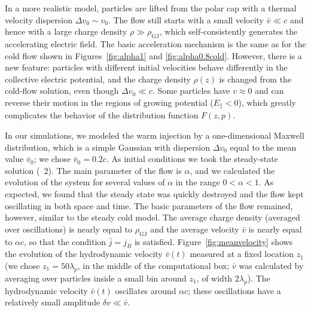 In a more realistic model, particles are lifted from the polar cap with a thermal
velocity dispersion $\Delta v_0\sim v_0$. The flow still starts with a small velocity
$\bar{v}\ll c$ and hence with a large charge density
$\rho\gg\rho_\mathrm{GJ}$, which self-consistently generates the accelerating electric field.
The basic acceleration mechanism is the same as for the cold flow shown in
Figures~\ref{fig:alpha1} and \ref{fig:alpha0.8cold}. However, there is a new feature:
particles with different
initial velocities behave differently in the collective electric potential, and the charge
density $\rho(z)$ is changed from the cold-flow solution, even though $\Delta v_0\ll c$.
Some particles have $v\approx 0$ and can reverse their motion in the regions of
growing potential ($E_\parallel<0$), which greatly complicates the behavior of the
distribution function $F(z,p)$.

In our simulations, we modeled the warm injection by a one-dimensional Maxwell
distribution, which is a simple Gaussian with dispersion $\Delta v_0$ equal to the
mean value $\bar{v}_0$; we chose $\bar{v}_0=0.2c$.
As initial conditions we took the steady-state solution (\Sect~2).
The main parameter of the flow is $\alpha$, and we calculated the evolution
of the system for several values of $\alpha$ in the range $0<\alpha<1$.
As expected, we found that the steady state was quickly destroyed and
the flow kept oscillating in both space and time. The basic parameters of the flow
remained, however, similar to the steady cold model. The average charge density
(averaged over oscillations) is nearly equal to $\rho_\mathrm{GJ}$ and the average velocity $\bar{v}$
is nearly equal to $\alpha c$, so that the condition $\bar{j}=j_B$ is satisfied.
Figure~\ref{fig:meanvelocity} shows the evolution of the hydrodynamic velocity
$\bar{v}(t)$
measured at a fixed location $z_1$ (we chose $z_1=50\lambda_p$, in the middle
of the computational box; $\bar{v}$ was calculated by averaging over
particles inside a small bin around $z_1$, of width $2\lambda_p$).
The hydrodynamic velocity $\bar{v}(t)$
oscillates around $\alpha c$;
these oscillations have a relatively small amplitude $\delta v\ll \bar{v}$.

